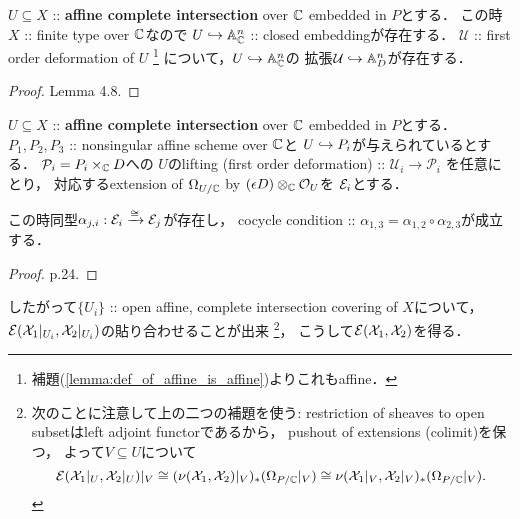 \documentclass[a4paper]{jsarticle}
\newcommand{\defX}{\mathcal{X}}
\newcommand{\defU}{\mathcal{U}}
\newcommand{\defP}{\mathcal{P}}
\begin{document}
    \begin{Lemma}
        $U \subseteq X$ :: \textbf{affine complete intersection} over $\mathbb{C}$ embedded in $P$とする．
        この時$X$ :: finite type over $\mathbb{C}$なので
        $U \hookrightarrow \mathbb{A}^n_{\mathbb{C}}$ :: closed embeddingが存在する．
        $\defU$ :: first order deformation of $U$ 
        \footnote{ 補題(\ref{lemma:def_of_affine_is_affine})よりこれもaffine． }
        について，$U \hookrightarrow \mathbb{A}^{n}_{\mathbb{C}}$の
        拡張$\defU \inclmap \affine^{n}_{D}$が存在する．
    \end{Lemma}
    \begin{proof}
        \cite{DefLCI} Lemma 4.8.
    \end{proof}

    \begin{Lemma}
        $U \subseteq X$ :: \textbf{affine complete intersection} over $\mathbb{C}$ embedded in $P$とする．
        $P_1, P_2, P_3$ :: nonsingular affine scheme over $\mathbb{C}$と
        $U \hookrightarrow P_i$が与えられているとする．
        $\defP_i=P_i \times_{\C} D$への
        $U$のlifting (first order deformation) :: $\defU_i \to \defP_i$
        を任意にとり，
        対応するextension of $\Omega_{U/\mathbb{C}}$ by $(\epsilon D) \otimes_{\mathbb{C}} \mathcal{O}_{U}$を
        $\mathcal{E}_i$とする．
        
        この時同型$\alpha_{j, i}: \mathcal{E}_i \xrightarrow{\cong} \mathcal{E}_j$が存在し，
        cocycle condition :: $\alpha_{1,3}=\alpha_{1,2} \circ \alpha_{2,3}$が成立する．
    \end{Lemma}
    \begin{proof}
        \cite{DefLCI} p.24.
    \end{proof}

    したがって$\{U_i\}$ :: open affine, complete intersection covering of $X$について，
    $\shE(\defX_1|_{U_i}, \defX_2|_{U_i})$の貼り合わせることが出来
    \footnote
    {
        次のことに注意して上の二つの補題を使う:
        restriction of sheaves to open subsetはleft adjoint functorであるから，
        pushout of extensions (colimit)を保つ，
        よって$V \subseteq U$について
        \[
            \shE(\defX_1|_U, \defX_2|_U)|_V
            \iso (\nu(\defX_1, \defX_2)|_V)_*(\shDer_{P/\C}|_{V})
            \iso \nu(\defX_1|_V, \defX_2|_V)_*(\shDer_{P/\C}|_{V}).
        \]
    }，
    こうして$\shE(\defX_1, \defX_2)$を得る．
\end{document}
